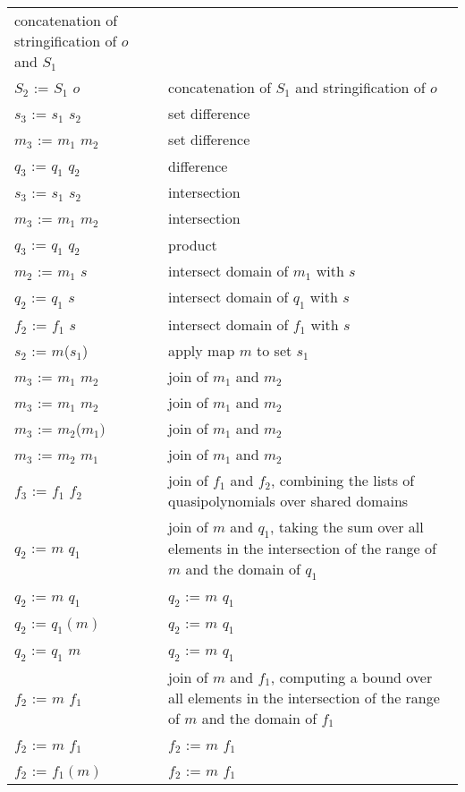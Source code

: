 \begin{supertabular}{p{0.35\textwidth}p{0.6\textwidth}}
concatenation of stringification of $o$ and $S_1$
\\
$S_2$ := $S_1$ \ai{$+$} $o$ &
concatenation of $S_1$ and stringification of $o$
\\
$s_3$ := $s_1$ \ai{$-$} $s_2$ & set difference
\\
$m_3$ := $m_1$ \ai{$-$} $m_2$ & set difference
\\
$q_3$ := $q_1$ \ai{$-$} $q_2$ & difference
\\
$s_3$ := $s_1$ \ai{$*$} $s_2$ & intersection
\\
$m_3$ := $m_1$ \ai{$*$} $m_2$ & intersection
\\
$q_3$ := $q_1$ \ai{$*$} $q_2$ & product
\\
$m_2$ := $m_1$ \ai{$*$} $s$ & intersect domain of $m_1$ with $s$
\\
$q_2$ := $q_1$ \ai{$*$} $s$ & intersect domain of $q_1$ with $s$
\\
$f_2$ := $f_1$ \ai{$*$} $s$ & intersect domain of $f_1$ with $s$
\\
$s_2$ := $m$($s_1$) & apply map $m$ to set $s_1$
\\
$m_3$ := $m_1$  $m_2$ & join of $m_1$ and $m_2$
\\
$m_3$ := $m_1$  $m_2$ & join of $m_1$ and $m_2$
\\
$m_3$ := $m_2$($m_1)$ & join of $m_1$ and $m_2$
\\
$m_3$ := $m_2$  $m_1$ & join of $m_1$ and $m_2$
\\
$f_3$ := $f_1$  $f_2$ & join of $f_1$ and $f_2$, combining
the lists of quasipolynomials over shared domains
\\
$q_2$ := $m$  $q_1$ & join of $m$ and $q_1$, taking the sum
over all elements in the intersection of the range of $m$ and the domain
of $q_1$
\\
$q_2$ := $m$  $q_1$ & $q_2$ := $m$  $q_1$
\\
$q_2$ := $q_1(m)$ & $q_2$ := $m$  $q_1$
\\
$q_2$ := $q_1$  $m$ & $q_2$ := $m$  $q_1$
\\
$f_2$ := $m$  $f_1$ & join of $m$ and $f_1$, computing a bound
over all elements in the intersection of the range of $m$ and the domain
of $f_1$
\\
$f_2$ := $m$  $f_1$ & $f_2$ := $m$  $f_1$
\\
$f_2$ := $f_1(m)$ & $f_2$ := $m$  $f_1$

\end{supertabular}
